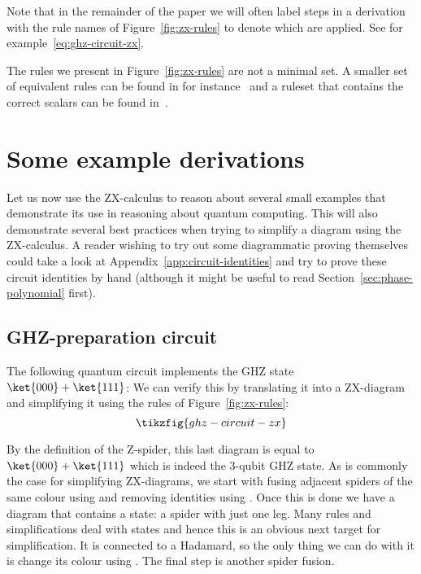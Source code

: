 \documentclass[a4paper,onecolumn,superscriptaddress,11pt,%
				unpublished,%
				allowfontchageintitle,%
				]{quantumarticle}
\begin{document}
Note that in the remainder of the paper we will often label steps in a derivation with the rule names of Figure~\ref{fig:zx-rules} to denote which are applied. See for example~\eqref{eq:ghz-circuit-zx}.

The rules we present in Figure~\ref{fig:zx-rules} are not a minimal set. A smaller set of equivalent rules can be found in for instance~\cite[Definition~9.108]{CKbook} and a ruleset that contains the correct scalars can be found in~\cite{BackensSimplified}.


\section{Some example derivations}\label{sec:example-derivations}

Let us now use the ZX-calculus to reason about several small examples that demonstrate its use in reasoning about quantum computing. This will also demonstrate several best practices when trying to simplify a diagram using the ZX-calculus.
A reader wishing to try out some diagrammatic proving themselves could take a look at Appendix~\ref{app:circuit-identities} and try to prove these circuit identities by hand (although it might be useful to read Section~\ref{sec:phase-polynomial} first).


\subsection{GHZ-preparation circuit}\label{sec:ghz}
The following quantum circuit implements the GHZ state $\ket{000}+\ket{111}$:
We can verify this by translating it into a ZX-diagram and simplifying it using the rules of Figure~\ref{fig:zx-rules}:
\begin{equation}\label{eq:ghz-circuit-zx}
\tikzfig{ghz-circuit-zx}
\end{equation}

By the definition of the Z-spider, this last diagram is equal to $\ket{000}+\ket{111}$ which is indeed the 3-qubit GHZ state.
As is commonly the case for simplifying ZX-diagrams, we start with fusing adjacent spiders of the same colour using \SpiderRule and removing identities using \IdRule. Once this is done we have a diagram that contains a state: a spider with just one leg. Many rules and simplifications deal with states and hence this is an obvious next target for simplification. It is connected to a Hadamard, so the only thing we can do with it is change its colour using \HadamardRule. The final step is another spider fusion.
\end{document}
